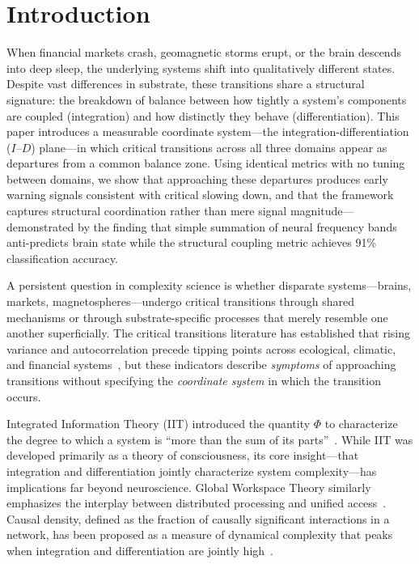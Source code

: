 \documentclass[12pt,a4paper]{article}
\begin{document}
\section{Introduction}

When financial markets crash, geomagnetic storms erupt, or the brain descends into deep sleep, the underlying systems shift into qualitatively different states. Despite vast differences in substrate, these transitions share a structural signature: the breakdown of balance between how tightly a system's components are coupled (integration) and how distinctly they behave (differentiation). This paper introduces a measurable coordinate system---the integration-differentiation ($I$--$D$) plane---in which critical transitions across all three domains appear as departures from a common balance zone. Using identical metrics with no tuning between domains, we show that approaching these departures produces early warning signals consistent with critical slowing down, and that the framework captures structural coordination rather than mere signal magnitude---demonstrated by the finding that simple summation of neural frequency bands anti-predicts brain state while the structural coupling metric achieves 91\% classification accuracy.

A persistent question in complexity science is whether disparate systems---brains, markets, magnetospheres---undergo critical transitions through shared mechanisms or through substrate-specific processes that merely resemble one another superficially. The critical transitions literature has established that rising variance and autocorrelation precede tipping points across ecological, climatic, and financial systems~\cite{scheffer2009,dakos2012}, but these indicators describe \emph{symptoms} of approaching transitions without specifying the \emph{coordinate system} in which the transition occurs.

Integrated Information Theory (IIT) introduced the quantity $\Phi$ to characterize the degree to which a system is ``more than the sum of its parts''~\cite{tononi2016,tononi2004}. While IIT was developed primarily as a theory of consciousness, its core insight---that integration and differentiation jointly characterize system complexity---has implications far beyond neuroscience. Global Workspace Theory similarly emphasizes the interplay between distributed processing and unified access~\cite{baars1988}. Causal density, defined as the fraction of causally significant interactions in a network, has been proposed as a measure of dynamical complexity that peaks when integration and differentiation are jointly high~\cite{seth2011}.
\end{document}
